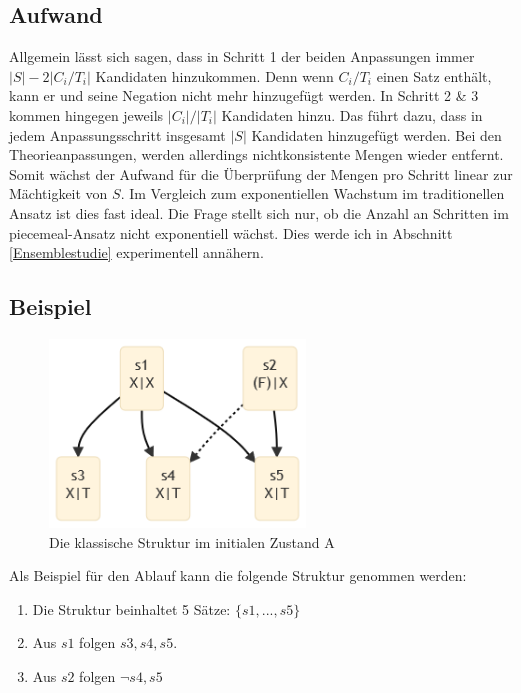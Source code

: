 \documentclass{article}
\begin{document}
\subsection{Aufwand}
Allgemein lässt sich sagen, dass in Schritt 1 der beiden Anpassungen immer $\lvert S \rvert - 2\lvert C_i/T_i \rvert$ Kandidaten hinzukommen. Denn wenn $C_i/T_i$ einen Satz enthält, kann er und seine Negation nicht mehr hinzugefügt werden. In Schritt 2 \& 3 kommen hingegen jeweils $\lvert C_i \rvert / \lvert T_i \rvert$ Kandidaten hinzu. Das führt dazu, dass in jedem Anpassungsschritt insgesamt $\lvert S \rvert$ Kandidaten hinzugefügt werden. Bei den Theorieanpassungen, werden allerdings nichtkonsistente Mengen wieder entfernt. Somit wächst der Aufwand für die Überprüfung der Mengen pro Schritt linear zur Mächtigkeit von $S$. Im Vergleich zum exponentiellen Wachstum im traditionellen Ansatz ist dies fast ideal. Die Frage stellt sich nur, ob die Anzahl an Schritten im piecemeal-Ansatz nicht exponentiell wächst. Dies werde ich in Abschnitt \ref{Ensemblestudie} experimentell annähern.

\subsection{Beispiel}
\begin{figure}[ht]
  \centering
  \includegraphics[width=\textwidth,height=5cm,keepaspectratio]{images/reduced_classical.png}
  \caption{Die klassische Struktur im initialen Zustand A\label{fig:classset-initial1}}
\end{figure}

 Als Beispiel für den Ablauf kann die folgende Struktur genommen werden:
 \begin{enumerate}
     \item Die Struktur beinhaltet 5 Sätze: $\{s1,...,s5\}$
     \item Aus $s1$ folgen $s3, s4, s5$.
     \item Aus $s2$ folgen $\neg s4, s5$
 \end{enumerate}
 
\end{document}
